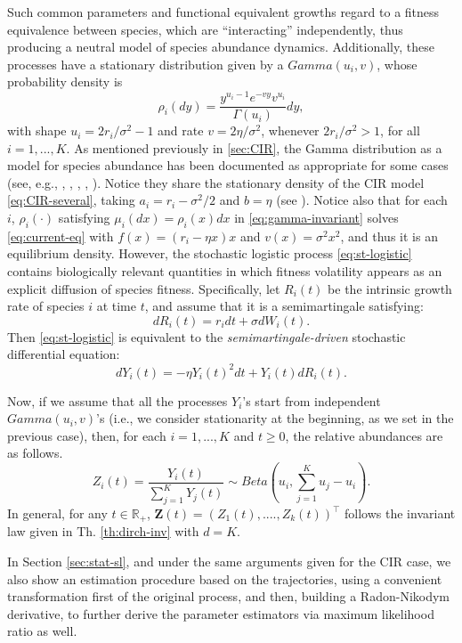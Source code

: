 \documentclass[12pt]{article}
\begin{document}
Such common parameters and functional equivalent growths regard to a fitness equivalence between species, which are ``interacting'' independently, thus producing a neutral model of species abundance dynamics. Additionally, these processes have a stationary distribution given by a $Gamma(u_i,v)$, whose probability density is
\begin{equation}\label{eq:gamma-invariant}
\rho_i(dy)=\frac{y^{u_i-1}e^{-vy}v^{u_i}}{\Gamma(u_i)}dy,
\end{equation}
with shape $u_i=2r_i/\sigma^2-1$ and rate $v=2\eta/\sigma^2$, whenever  $2r_i/\sigma^2>1$, for all $i=1,...,K$. As mentioned previously in \ref{sec:CIR}, the Gamma distribution as a model for species abundance has been documented as appropriate for some cases (see, e.g., \citep{dennis1984gamma}, \citep{schmidt1985species}, \citep{engen1996population}, \citep{diserud2000general}, \citep{azaele2006dynamical}).
Notice they share the stationary density of the CIR model \eqref{eq:CIR-several}, taking $a_i=r_i-\sigma^2/2$ and $b=\eta$
(see \citep{azaele2006dynamical}). Notice also that for each $i$, $\rho_i(\cdot)$ satisfying $\mu_i(dx)=\rho_i(x)dx$ in \eqref{eq:gamma-invariant} solves \eqref{eq:current-eq} with $f(x)=(r_i-\eta x)x$ and $v(x)=\sigma^2 x^2$, and thus it is an equilibrium density.
However, the stochastic logistic process \eqref{eq:st-logistic}  contains biologically relevant quantities in which fitness volatility appears as an explicit diffusion of species fitness. Specifically, let $R_i(t)$ be the intrinsic growth rate of species $i$ at time $t$, and assume that it is a semimartingale satisfying:
\[
dR_i(t)=r_idt+\sigma dW_i(t).
\]
Then \eqref{eq:st-logistic} is equivalent to the \textit{semimartingale-driven} stochastic differential equation:
\[
dY_i(t)=-\eta Y_i(t)^2dt+Y_i(t)dR_i(t).
\]

Now, if we assume that all the processes $Y_i$'s start from independent $Gamma(u_i,v)$'s (i.e., we consider stationarity at the beginning, as we set in the previous case), then, for each $i=1,...,K$ and $t\geq0$, the relative abundances are as follows.
\begin{equation}\label{eq:relative-abundance}
Z_i(t)=\frac{Y_i(t)}{\sum_{j=1}^{K}Y_j(t)}\sim Beta(u_i,\sum_{j=1}^{K}u_j-u_i).
\end{equation}
In general, for any $t\in\mathbb{R}_+$, $\mathbf{Z}(t)=(Z_1(t), ...., Z_k(t))^\top$ follows the invariant law given in Th. \ref{th:dirch-inv} with $d=K$.

In Section \ref{sec:stat-sl}, and under the same arguments given for the CIR case, we also show an estimation procedure based on the trajectories, using a convenient transformation first of the original process, and then,  building  a Radon-Nikodym derivative, to further derive the parameter estimators via maximum likelihood ratio as well. 
\end{document}
